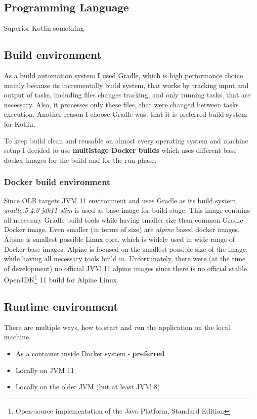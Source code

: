 \subsection{Programming Language}\label{subsec:programming-language}
Superior Kotlin something

\subsection{Build environment}
As a build automation system I used Gradle, 
which is high performance choice mainly because its incrementally build system,
that works by tracking input and output of tasks, 
including files changes tracking, and only running tasks, that are necessary. 
Also, it processes only these files, that were changed between tasks execution. 
Another reason I choose Gradle was, that it is preferred build system for Kotlin.

To keep build clean and reusable on almost every operating system and 
machine setup I decided to use \textbf{multistage Docker builds}
which uses different base docker images for the build and for the run phase.

\subsubsection{Docker build environment}
Since OLB targets JVM 11 environment and uses Gradle as its build system,
\textit{gradle:5.4.0-jdk11-slim} is used as base image for build stage.
This image contains all necessary Gradle build tools while having smaller size than common Gradle Docker image.
Even smaller (in terms of size) are \textit{alpine} based docker images. 
Alpine is smallest possible Linux core, 
which is widely used in wide range of Docker base images.
Alpine is focused on the smallest possible size of the image, 
while having all necessary tools build in.
Unfortunately, there were (at the time of development) no official JVM 11 alpine images
since there is no official stable OpenJDK\footnote{Open-source implementation of the Java Platform, Standard Edition} 
11 build for Alpine Linux.

\subsection{Runtime environment}
There are multiple ways, how to start and run the application on the local machine.
\begin{itemize}
    \item As a container inside Docker system - \textbf{preferred}
    \item Locally on JVM 11
    \item Locally on the older JVM (but at least JVM 8)
\end{itemize}

